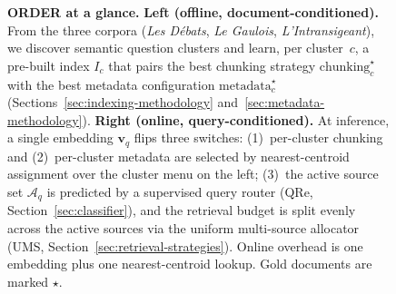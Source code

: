 \begin{figure}[t]

\caption{\textbf{ORDER at a glance.}
\textbf{Left (offline, document-conditioned).} From the three corpora
(\textit{Les Débats}, \textit{Le Gaulois}, \textit{L'Intransigeant}),
we discover semantic question clusters and learn, per cluster~$c$, a
pre-built index $I_c$ that pairs the best chunking strategy
$\text{chunking}_c^{\star}$ with the best metadata configuration
$\text{metadata}_c^{\star}$ (Sections~\ref{sec:indexing-methodology}
and~\ref{sec:metadata-methodology}).
\textbf{Right (online, query-conditioned).} At inference, a single
embedding $\mathbf{v}_q$ flips three switches: (1)~per-cluster
chunking and (2)~per-cluster metadata are selected by nearest-centroid
assignment over the cluster menu on the left; (3)~the active source
set $\mathcal{A}_q$ is predicted by a supervised query router (QRe,
Section~\ref{sec:classifier}), and the retrieval budget is split
evenly across the active sources via the uniform multi-source
allocator (UMS, Section~\ref{sec:retrieval-strategies}). Online
overhead is one embedding plus one nearest-centroid lookup. Gold
documents are marked $\star$.}
\label{fig:banner}
\end{figure}